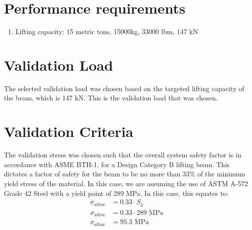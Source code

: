 \documentclass{paper}
\begin{document}
\section{Performance requirements}
\begin{enumerate}
\item Lifting capacity: 15 metric tons, 15000kg, 33000 lbm, 147 kN
\end{enumerate}
\section{Validation Load}
The selected validation load was chosen based on the targeted lifting capacity of the beam, which is 147 kN. This is the validation load that was chosen. 
\section{Validation Criteria}
The validation stress was chosen such that the overall system safety factor is in accordance with ASME BTH-1, for a Design Category B lifting beam. This dictates a factor of safety for the beam to be no more than 33\% of the minimum yield stress of the material. In this case, we are assuming the use of ASTM A-572 Grade 42 Steel with a yield point of 289 MPa. 
In this case, this equates to:
\begin{align*}
	\sigma_{\mathit{allow}} &= 0.33 \cdot S_{y}\\
	\sigma_{allow} &= 0.33 \cdot 289  \text{ MPa} \\
	\sigma_{allow} &= 95.3 \text{ MPa}
\end{align*}
\end{document}
